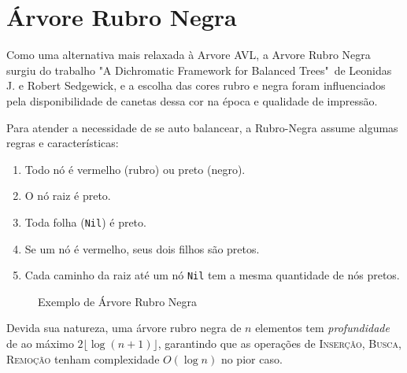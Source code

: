 \section{Árvore Rubro Negra}
\label{sec:rubro}

Como uma alternativa mais relaxada à Arvore AVL, a Arvore Rubro Negra surgiu do trabalho "A Dichromatic Framework for Balanced Trees"\ de Leonidas J. e Robert Sedgewick, e a escolha das cores rubro e negra foram influenciados pela disponibilidade de canetas dessa cor na época e qualidade de impressão.

Para atender a necessidade de se auto balancear, a Rubro-Negra assume algumas regras e características:

\begin{enumerate}
	\item Todo nó é vermelho (rubro) ou preto (negro).
	\item O nó raiz é preto.
	\item Toda folha (\texttt{Nil}) é preto.
	\item Se um nó é vermelho, seus dois filhos são pretos.
	\item Cada caminho da raiz até um nó \texttt{Nil} tem a mesma quantidade de nós pretos.
\end{enumerate}

\begin{figure}[!ht]
	\centering
	\caption{Exemplo de Árvore Rubro Negra}
	\label{fig:rubro_example}
\end{figure}
\FloatBarrier


Devida sua natureza, uma árvore rubro negra de $n$ elementos tem \textit{profundidade} de ao máximo $2\lfloor\log (n + 1)\rfloor$, garantindo que as operações de \textrm{I\textsc{nserção}}, \textrm{B\textsc{usca}}, \textrm{R\textsc{emoção}} tenham complexidade $O(\log n)$ no pior caso.

